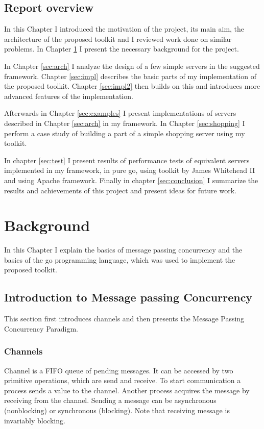 \documentclass[12pt,a4paper]{article}
\begin{document}
\subsection{Report overview}
In this Chapter I introduced the motivation of the project, its main
aim, the architecture of the proposed toolkit and I reviewed work done
on similar problems. In Chapter \ref{sec:background}
I present the necessary background for the project.

In Chapter \ref{sec:arch} I analyze the design of a few simple servers
in the suggested framework. Chapter \ref{sec:impl} describes the basic parts of 
my implementation of the proposed toolkit. Chapter \ref{sec:impl2} then builds
on this and introduces more advanced features of the implementation.

Afterwards in Chapter \ref{sec:examples} I present
implementations of servers described in Chapter \ref{sec:arch} in my framework.
In Chapter \ref{sec:shopping} I perform a case study of building
a part of a simple shopping server using my toolkit.

In chapter \ref{sec:test} I present results of performance tests of equivalent 
servers implemented in my framework, in pure go, using toolkit by James Whitehead II
\cite{whitehead} and using Apache framework. Finally in chapter 
\ref{sec:conclusion} I summarize the results and achievements of this 
project and present ideas for future work.

\newpage
\section{Background}
\label{sec:background}
In this Chapter I explain the basics of message passing concurrency and 
the basics of the go programming language, which was used to implement 
the proposed toolkit.

\subsection{Introduction to Message passing Concurrency}
This section first introduces channels and then presents the Message
Passing Concurrency Paradigm.

\subsubsection{Channels}
Channel is a FIFO queue of pending messages. It can be accessed by two
primitive operations, which are send and receive. To start communication
a process sends a value to the channel. Another process acquires the message
by receiving from the channel. Sending a message can be asynchronous (nonblocking)
or synchronous (blocking). Note that receiving message is invariably blocking.
\cite[293]{book:foundations}
\end{document}
